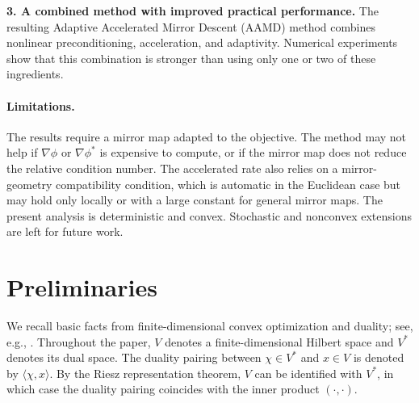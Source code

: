 \documentclass{article}
\theoremstyle{plain}
\theoremstyle{definition}
\theoremstyle{remark}
\begin{document}
\noindent\textbf{3. A combined method with improved practical performance.}
The resulting Adaptive Accelerated Mirror Descent (AAMD) method combines nonlinear preconditioning, acceleration, and adaptivity. Numerical experiments show that this combination is stronger than using only one or two of these ingredients.

%
%
%

\paragraph{Limitations.}
The results require a mirror map adapted to the objective. The method may not help if $\nabla\phi$ or $\nabla\phi^*$ is expensive to compute, or if the mirror map does not reduce the relative condition number. The accelerated rate also relies on a mirror-geometry compatibility condition, which is automatic in the Euclidean case but may hold only locally or with a large constant for general mirror maps. The present analysis is deterministic and convex. Stochastic and nonconvex extensions are left for future work.

\section{Preliminaries}\label{sec: Preliminaries}

We recall basic facts from finite-dimensional convex optimization and duality; see, e.g., \cite{bertsekas2009convex,rockafellar1970convex}. Throughout the paper, $V$ denotes a finite-dimensional Hilbert space and $V^*$ denotes its dual space. The duality pairing between $\chi\in V^*$ and $x\in V$ is denoted by $\langle \chi,x\rangle$. By the Riesz representation theorem, $V$ can be identified with $V^*$, in which case the duality pairing coincides with the inner product $(\cdot,\cdot)$.
\end{document}
